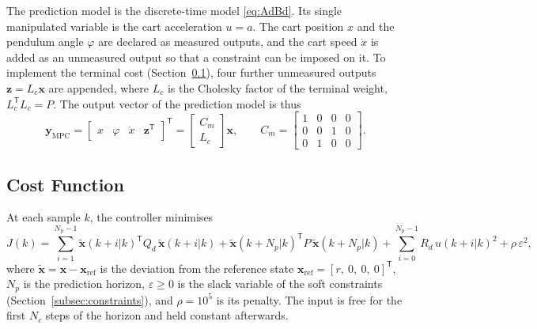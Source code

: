 The prediction model is the discrete-time model \eqref{eq:AdBd}. Its single
manipulated variable is the cart acceleration $u = a$. The cart position $x$
and the pendulum angle $\varphi$ are declared as measured outputs, and the cart
speed $\dot{x}$ is added as an unmeasured output so that a constraint can be
imposed on it. To implement the terminal cost (Section~\ref{subsec:cost}),
four further unmeasured outputs $\mathbf{z} = L_c\mathbf{x}$ are appended,
where $L_c$ is the Cholesky factor of the terminal weight,
$L_c^{\mathsf{T}}L_c = P$. The output vector of the prediction model is thus
\begin{equation}
  \mathbf{y}_{\mathrm{MPC}} =
  \begin{bmatrix} x & \varphi & \dot{x} & \mathbf{z}^{\mathsf{T}} \end{bmatrix}^{\mathsf{T}}
  = \begin{bmatrix} C_m \\ L_c \end{bmatrix}\mathbf{x}, \qquad
  C_m = \begin{bmatrix} 1&0&0&0\\ 0&0&1&0\\ 0&1&0&0 \end{bmatrix}.
  \label{eq:mpcoutputs}
\end{equation}

\subsection{Cost Function}
\label{subsec:cost}

At each sample $k$, the controller minimises
\begin{equation}
  J(k) = \sum_{i=1}^{N_p-1} \tilde{\mathbf{x}}(k+i|k)^{\mathsf{T}} Q_d\,
         \tilde{\mathbf{x}}(k+i|k)
       + \tilde{\mathbf{x}}(k+N_p|k)^{\mathsf{T}} P\,
         \tilde{\mathbf{x}}(k+N_p|k)
       + \sum_{i=0}^{N_p-1} R_d\, u(k+i|k)^2
       + \rho\,\varepsilon^2,
  \label{eq:cost}
\end{equation}
where $\tilde{\mathbf{x}} = \mathbf{x} - \mathbf{x}_{\mathrm{ref}}$ is the
deviation from the reference state $\mathbf{x}_{\mathrm{ref}} = [r,\ 0,\ 0,\ 0]^{\mathsf{T}}$,
$N_p$ is the prediction horizon, $\varepsilon \ge 0$ is the slack variable of
the soft constraints (Section~\ref{subsec:constraints}), and $\rho = 10^5$ is
its penalty. The input is free for the first $N_c$ steps of the horizon and
held constant afterwards.

